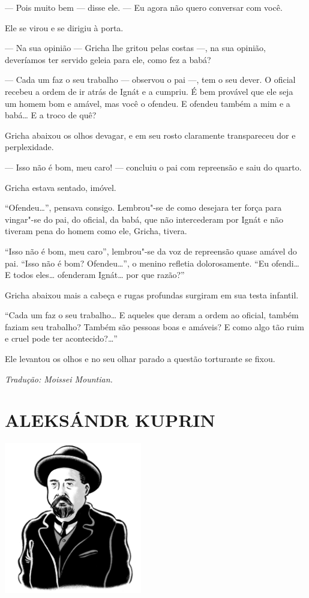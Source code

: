 --- Pois muito bem --- disse ele. --- Eu agora não quero conversar com
você.

Ele se virou e se dirigiu à porta.

--- Na sua opinião --- Gricha lhe gritou pelas costas ---, na sua
opinião, deveríamos ter servido geleia para ele, como fez a babá?

--- Cada um faz o seu trabalho --- observou o pai ---, tem o seu dever.
O oficial recebeu a ordem de ir atrás de Ignát e a cumpriu. É bem
provável que ele seja um homem bom e amável, mas você o ofendeu. E
ofendeu também a mim e a babá\ldots{} E a troco de quê?

Gricha abaixou os olhos devagar, e em seu rosto claramente transpareceu
dor e perplexidade.

--- Isso não é bom, meu caro! --- concluiu o pai com repreensão e saiu
do quarto.

Gricha estava sentado, imóvel.

``Ofendeu\ldots{}'', pensava consigo. Lembrou"-se de como desejara ter força
para vingar"-se do pai, do oficial, da babá, que não intercederam por
Ignát e não tiveram pena do homem como ele, Gricha, tivera.

``Isso não é bom, meu caro'', lembrou"-se da voz de repreensão quase
amável do pai. ``Isso não é bom? Ofendeu\ldots{}'', o menino refletia
dolorosamente. ``Eu ofendi\ldots{} E todos eles\ldots{} ofenderam Ignát\ldots{} por que
razão?''

Gricha abaixou mais a cabeça e rugas profundas surgiram em sua testa
infantil.

``Cada um faz o seu trabalho\ldots{} E aqueles que deram a ordem ao oficial,
também faziam seu trabalho? Também são pessoas boas e amáveis? E como
algo tão ruim e cruel pode ter acontecido?\ldots{}''

Ele levantou os olhos e no seu olhar parado a questão torturante se
fixou.

\medskip

{\footnotesize\hfill\emph{Tradução: Moissei Mountian.}}


\part[ALEKSÁNDR KUPRIN]{ALEKSÁNDR KUPRIN }

\pagebreak
\thispagestyle{empty}
\mbox{}
\vfill
\begin{center}
\includegraphics[width=6cm]{./imgs/autor9.jpg}
\end{center}

